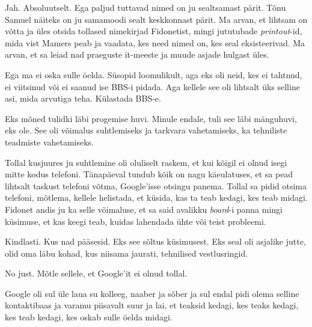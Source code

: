 
Jah. Absoluutselt. Ega paljud tuttavad nimed on ju sealtsamast pärit. Tõnu Samuel näiteks on ju samamoodi sealt keskkonnast pärit. Ma arvan, et lihtsam on võtta ja üles otsida tollased nimekirjad Fidonetist, mingi jututubade \emph{printout}-id, mida vist Mamers peab ja vaadata, kes need nimed on, kes seal eksisteerivad. Ma arvan, et sa leiad nad praeguste it-meeste ja muude asjade hulgast üles.

                 
Ega ma ei oska sulle öelda. Süsopid loomulikult, aga eks oli neid, kes ei tahtnud, ei viitsinud või ei saanud ise BBS-i pidada. Aga kellele see oli lihtsalt üks selline asi, mida arvutiga teha. Külastada BBS-e.


Eks mõned tulidki läbi progemise huvi. Minule endale, tuli see läbi mänguhuvi, eks ole. See oli võimalus suhtlemiseks ja tarkvara vahetamiseks,  ka tehniliste teadmiste vahetamiseks.

Tollal kusjuures ju suhtlemine oli oluliselt raskem, et kui kõigil ei olnud isegi mitte kodus telefoni. Tänapäeval tundub  kõik on nagu käeulatuses, et sa pead lihtsalt taskust telefoni võtma, Google'isse otsingu panema. Tollal sa pidid otsima telefoni, mõtlema, kellele helistada, et küsida, kas ta teab kedagi, kes teab midagi. Fidonet andis ju ka  selle võimaluse, et sa said avalikku \emph{board}-i panna mingi küsimuse, et kas keegi teab, kuidas lahendada ühte või teist probleemi.


Kindlasti. Kus nad pääsesid. Eks see sõltus  küsimusest. Eks seal oli asjalike jutte, olid oma läbu kohad, kus niisama jaurati, tehnilised vestlusringid.
                 

No just. Mõtle sellele, et Google'it ei olnud tollal.

Google oli sul üle laua su kolleeg, naaber ja sõber ja sul endal pidi olema selline kontaktibaas ja varamu piisavalt suur ja lai, et teaksid kedagi, kes teaks kedagi, kes teab kedagi, kes oskab sulle öelda midagi.
                 
